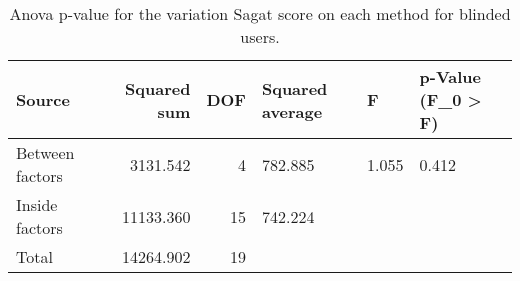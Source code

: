 
\begin{table}[!htb]
\centering
\caption{Anova p-value for the variation Sagat score on each method for blinded users.}
\label{tab:anova_sagat_var}
\begin{tabular}{lrrlll}
\toprule
         Source &  Squared sum &  DOF & Squared average &     F & p-Value (F\_0 > F) \\
\midrule
Between factors &     3131.542 &    4 &         782.885 & 1.055 &             0.412 \\
 Inside factors &    11133.360 &   15 &         742.224 &       &                   \\
          Total &    14264.902 &   19 &                 &       &                   \\
\bottomrule
\end{tabular}
\end{table}

